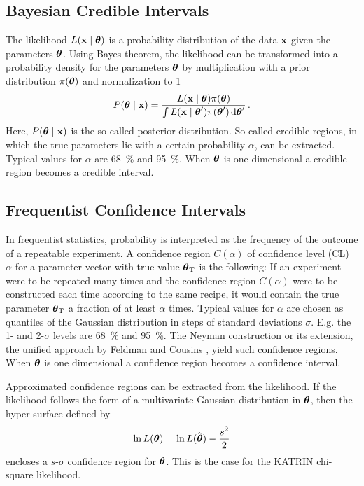 \subsection{Bayesian Credible Intervals}
The likelihood $L\giventhat{\dataVec}{\paramVec}$ is a probability distribution of the data $\boldsymbol{\mathbf{x}}$ given the parameters $\boldsymbol{\mathbf{\theta}}$. Using Bayes theorem, the likelihood can be transformed into a probability density for the parameters $\boldsymbol{\mathbf{\theta}}$ by multiplication with a prior distribution $\pi(\boldsymbol{\mathbf{\theta}})$ and normalization to 1
\begin{equation}
\label{eq:posterior}
	P\giventhat{\paramVec}{\dataVec} = 
		\frac{
			L\giventhat{\dataVec}{\paramVec}\pi(\paramVec)
		}{
			\int L\giventhat{\dataVec}{\paramVec^\prime}\pi(\paramVec^\prime) \d\paramVec^\prime
		}
	\fullstop
\end{equation}
Here, $P\giventhat{\paramVec}{\dataVec}$ is the so-called posterior distribution. So-called credible regions, in which the true parameters lie with a certain probability $\alpha$, can be extracted.  Typical values for $\alpha$ are \SI{68}{\percent} and \SI{95}{\percent}. When $\boldsymbol{\mathbf{\theta}}$ is one dimensional a credible region becomes a credible interval. 

\subsection{Frequentist Confidence Intervals}
In frequentist statistics, probability is interpreted as the frequency
of the outcome of a repeatable experiment. A confidence region $C(\alpha)$ of confidence level (CL) $\alpha$ for a parameter vector with true value $\boldsymbol{\mathbf{\theta}}_\mathrm{T}$ is the following: If an experiment were to be repeated many times and the confidence region $C(\alpha)$ were to be constructed each time according to the same recipe, it would contain the true parameter $\boldsymbol{\mathbf{\theta}}_\mathrm{T}$ a fraction of at least $\alpha$ times. Typical values for $\alpha$ are chosen as quantiles of the Gaussian distribution in steps of standard deviations $\sigma$. E.g. the 1- and 2-$\sigma$ levels are \SI{68}{\percent} and \SI{95}{\percent}. The Neyman construction \cite{Neyman1937} or its extension, the unified approach by Feldman and Cousins \cite{Feldman1998}, yield such confidence regions. When $\boldsymbol{\mathbf{\theta}}$ is one dimensional a confidence region becomes a confidence interval. 

Approximated confidence regions can be extracted from the likelihood. If the likelihood follows the form of a multivariate Gaussian distribution in $\boldsymbol{\mathbf{\theta}}$, then the hyper surface defined by
\begin{equation}
	\ln L(\boldsymbol{\mathbf{\theta}}) = 	\ln L(\hat{\boldsymbol{\mathbf{\theta}}}) - \frac{s^2}{2}
\end{equation}
encloses a $s$-$\sigma$ confidence region for $\boldsymbol{\mathbf{\theta}}$. This is the case for the KATRIN chi-square likelihood. 

